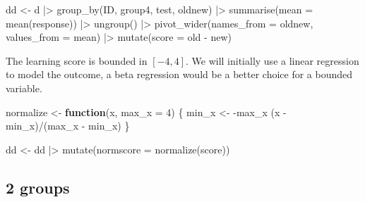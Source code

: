 \documentclass[
  man,floatsintext]{apa7}
\newenvironment{Shaded}{\begin{snugshade}}{\end{snugshade}}
\newcommand{\AttributeTok}[1]{\textcolor[rgb]{0.77,0.63,0.00}{#1}}
\newcommand{\ControlFlowTok}[1]{\textcolor[rgb]{0.13,0.29,0.53}{\textbf{#1}}}
\newcommand{\DecValTok}[1]{\textcolor[rgb]{0.00,0.00,0.81}{#1}}
\newcommand{\FunctionTok}[1]{\textcolor[rgb]{0.00,0.00,0.00}{#1}}
\newcommand{\NormalTok}[1]{#1}
\newcommand{\OtherTok}[1]{\textcolor[rgb]{0.56,0.35,0.01}{#1}}
\newcommand{\SpecialCharTok}[1]{\textcolor[rgb]{0.00,0.00,0.00}{#1}}
\begin{document}
\begin{Shaded}
\begin{Highlighting}[]
\NormalTok{dd }\OtherTok{\textless{}{-}}\NormalTok{ d }\SpecialCharTok{|\textgreater{}}
  \FunctionTok{group\_by}\NormalTok{(ID, group4, test, oldnew) }\SpecialCharTok{|\textgreater{}}
  \FunctionTok{summarise}\NormalTok{(}\AttributeTok{mean =} \FunctionTok{mean}\NormalTok{(response)) }\SpecialCharTok{|\textgreater{}}
  \FunctionTok{ungroup}\NormalTok{() }\SpecialCharTok{|\textgreater{}} 
  \FunctionTok{pivot\_wider}\NormalTok{(}\AttributeTok{names\_from =}\NormalTok{ oldnew, }\AttributeTok{values\_from =}\NormalTok{ mean) }\SpecialCharTok{|\textgreater{}}
  \FunctionTok{mutate}\NormalTok{(}\AttributeTok{score =}\NormalTok{ old }\SpecialCharTok{{-}}\NormalTok{ new) }
\end{Highlighting}
\end{Shaded}

The learning score is bounded in \([-4, 4]\). We will initially use a linear regression to model the outcome, a beta regression would be a better choice for a bounded variable.

\begin{Shaded}
\begin{Highlighting}[]
\NormalTok{normalize }\OtherTok{\textless{}{-}} \ControlFlowTok{function}\NormalTok{(x, }\AttributeTok{max\_x =} \DecValTok{4}\NormalTok{) \{}
\NormalTok{  min\_x }\OtherTok{\textless{}{-}} \SpecialCharTok{{-}}\NormalTok{max\_x}
\NormalTok{  (x }\SpecialCharTok{{-}}\NormalTok{ min\_x)}\SpecialCharTok{/}\NormalTok{(max\_x }\SpecialCharTok{{-}}\NormalTok{ min\_x)}
\NormalTok{  \}}

\NormalTok{dd }\OtherTok{\textless{}{-}}\NormalTok{ dd }\SpecialCharTok{|\textgreater{}} 
  \FunctionTok{mutate}\NormalTok{(}\AttributeTok{normscore =} \FunctionTok{normalize}\NormalTok{(score))}
\end{Highlighting}
\end{Shaded}

\hypertarget{groups}{%
\subsection{2 groups}\label{groups}}
\end{document}
